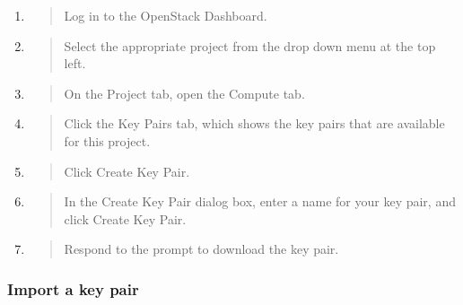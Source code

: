 {\begin{enumerate}
\def\labelenumi{\arabic{enumi}.}
\item
  \begin{quote}
  Log in to the \gls{OpenStack Dashboard}.
  \end{quote}
\item
  \begin{quote}
  Select the appropriate project from the drop down menu at the top
  left.
  \end{quote}
\item
  \begin{quote}
  On the Project tab, open the Compute tab.
  \end{quote}
\item
  \begin{quote}
  Click the Key Pairs tab, which shows the key pairs that are available
  for this project.
  \end{quote}
\item
  \begin{quote}
  Click Create Key Pair.
  \end{quote}
\item
  \begin{quote}
  In the Create Key Pair dialog box, enter a name for your key pair, and
  click Create Key Pair.
  \end{quote}
\item
  \begin{quote}
  Respond to the prompt to download the key pair.
  \end{quote}
\end{enumerate}

\subsubsection{Import a key pair}\label{import-a-key-pair}

}
